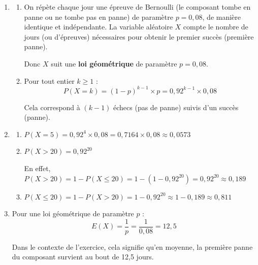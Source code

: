 \documentclass[TC, exos, e,p]{phBook}
\begin{document}
\begin{exercice}
\begin{enonce}
\begin{enumerate}
\end{enumerate}

    \end{enonce}

    \begin{correction}
        \begin{enumerate}
\item
	\begin{enumerate}
		\item On répète chaque jour une épreuve de Bernoulli (le composant tombe en panne ou ne tombe pas en panne) de paramètre $p = 0,08$, de manière identique et indépendante. La variable aléatoire $X$ compte le nombre de jours (ou d'épreuves) nécessaires pour obtenir le premier succès (première panne).

Donc $X$ suit une \textbf{loi géométrique} de paramètre $p = 0,08$.

		\item Pour tout entier $k \ge 1$ :
$$P(X = k) = (1-p)^{k-1} \times p = 0,92^{k-1} \times 0,08$$

Cela correspond à $(k-1)$ échecs (pas de panne) suivis d'un succès (panne).
	\end{enumerate}

\item
	\begin{enumerate}
		\item $P(X = 5) = 0,92^{4} \times 0,08 = 0,7164 \times 0,08 \approx 0,0573$

		\item $P(X > 20) = 0,92^{20}$

En effet, $P(X > 20) = 1 - P(X \le 20) = 1 - (1 - 0,92^{20}) = 0,92^{20} \approx 0,189$

		\item $P(X \le 20) = 1 - P(X > 20) = 1 - 0,92^{20} \approx 1 - 0,189 \approx 0,811$
	\end{enumerate}

\item Pour une loi géométrique de paramètre $p$ :
$$E(X) = \dfrac{1}{p} = \dfrac{1}{0,08} = 12,5$$

Dans le contexte de l'exercice, cela signifie qu'en moyenne, la première panne du composant survient au bout de 12,5 jours.


\end{enumerate}
\end{correction}
\end{exercice}
\end{document}
